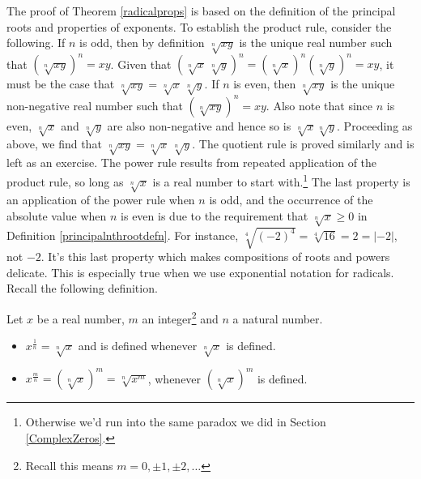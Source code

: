 \medskip

The proof of Theorem \ref{radicalprops} is based on the definition of the principal roots and properties of exponents. To establish the product rule, consider the following.  If $n$ is odd, then by definition $\sqrt[n]{xy}$ is the unique real number such that $(\sqrt[n]{xy})^{n} = xy$.  Given that $\left( \sqrt[n]{x} \, \sqrt[n]{y}\right)^n = \left(\sqrt[n]{x}\right)^n \left(\sqrt[n]{y}\right)^n = xy$, it must be the case that $\sqrt[n]{xy} = \sqrt[n]{x} \, \sqrt[n]{y}$. If $n$ is even, then $\sqrt[n]{xy}$ is the unique non-negative real number such that $(\sqrt[n]{xy})^{n} = xy$.  Also note that since $n$ is even, $\sqrt[n]{x}$ and $\sqrt[n]{y}$ are also non-negative and hence so is $\sqrt[n]{x}\sqrt[n]{y}$.  Proceeding as above, we find that $\sqrt[n]{xy} = \sqrt[n]{x} \, \sqrt[n]{y}$.  The quotient rule is proved similarly and is left as an exercise.  The power rule results from repeated application of the product rule, so long as $\sqrt[n]{x}$ is a real number to start with.\footnote{Otherwise we'd run into the same paradox we did in Section \ref{ComplexZeros}.}  The last property is an application of the power rule when $n$ is odd, and the occurrence of the absolute value when $n$ is even is due to the requirement that  $\sqrt[n]{x} \geq 0$ in Definition \ref{principalnthrootdefn}. For instance, $\sqrt[4]{(-2)^4} = \sqrt[4]{16}= 2 =  |-2|$, not $-2$.   It's this last property which makes compositions of roots and powers delicate.  This is especially true when we use exponential notation for radicals.  Recall the following definition.

\smallskip

\colorbox{ResultColor}{\bbm

\begin{defn}  \label{rationalexponentdefn} Let $x$ be a real number,  $m$ an integer\footnote{Recall this means $m = 0, \pm 1, \pm 2, \ldots$} and $n$ a natural number. 

\begin{itemize}

\item  $x^{\frac{1}{n}} = \sqrt[n]{x}$ and is defined whenever $\sqrt[n]{x}$ is defined.

\item  $x^{\frac{m}{n}}  = \left(\sqrt[n]{x}\right)^m = \sqrt[n]{x^m}$, whenever $\left(\sqrt[n]{x}\right)^{m}$ is defined.

\end{itemize}
\end{defn}

\ebm}

